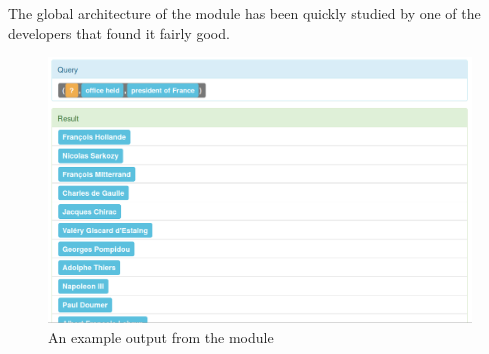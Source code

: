 The global architecture of the module has been quickly studied by one of the \Wikidata developers that found it fairly good.

\begin{figure}[!ht]
  \centering
    \label{struct}
    \caption{An example output from the \Wikidata module}
    \includegraphics[width=\textwidth]{./wikidata_list_presidents.png}
\end{figure}
